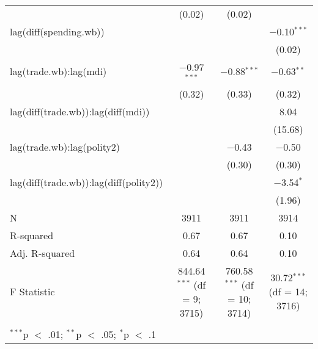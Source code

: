 \begin{table}[!htbp]
\begin{tabular}{@{\extracolsep{5pt}}lccc}
  & (0.02) & (0.02) &  \\ 
  lag(diff(spending.wb)) &  &  & $-$0.10$^{***}$ \\ 
  &  &  & (0.02) \\ 
  lag(trade.wb):lag(mdi) & $-$0.97$^{***}$ & $-$0.88$^{***}$ & $-$0.63$^{**}$ \\ 
  & (0.32) & (0.33) & (0.32) \\ 
  lag(diff(trade.wb)):lag(diff(mdi)) &  &  & 8.04 \\ 
  &  &  & (15.68) \\ 
  lag(trade.wb):lag(polity2) &  & $-$0.43 & $-$0.50 \\ 
  &  & (0.30) & (0.30) \\ 
  lag(diff(trade.wb)):lag(diff(polity2)) &  &  & $-$3.54$^{*}$ \\ 
  &  &  & (1.96) \\ 
 N & 3911 & 3911 & 3914 \\ 
R-squared & 0.67 & 0.67 & 0.10 \\ 
Adj. R-squared & 0.64 & 0.64 & 0.10 \\ 
F Statistic & 844.64$^{***}$ (df = 9; 3715) & 760.58$^{***}$ (df = 10; 3714) & 30.72$^{***}$ (df = 14; 3716) \\ 
\hline \\[-1.8ex] 
\multicolumn{4}{l}{$^{***}$p $<$ .01; $^{**}$p $<$ .05; $^{*}$p $<$ .1} \\ 
\end{tabular} 
\end{table} 
